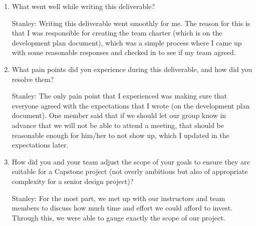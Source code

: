 \documentclass{article}
\begin{document}
\begin{enumerate}
    \item What went well while writing this deliverable? 
    
Stanley: Writing this deliverable went smoothly for me. The reason for this is that I was responsible for creating the team charter (which is on the development plan document), which was a simple process where I came up with some reasonable responses and checked in to see if my team agreed. 

    \item What pain points did you experience during this deliverable, and how
    did you resolve them?

Stanley: The only pain point that I experienced was making sure that everyone agreed with the expectations that I wrote (on the development plan document). One member said that if we should let our group know in advance that we will not be able to attend a meeting, that should be reasonable enough for him/her to not show up, which I updated in the expectations later.  

    \item How did you and your team adjust the scope of your goals to ensure
    they are suitable for a Capstone project (not overly ambitious but also of
    appropriate complexity for a senior design project)?

Stanley: For the most part, we met up with our instructors and team members to discuss how much time and effort we could afford to invest. Through this, we were able to gauge exactly the scope of our project.  

\end{enumerate}  
\end{document}
